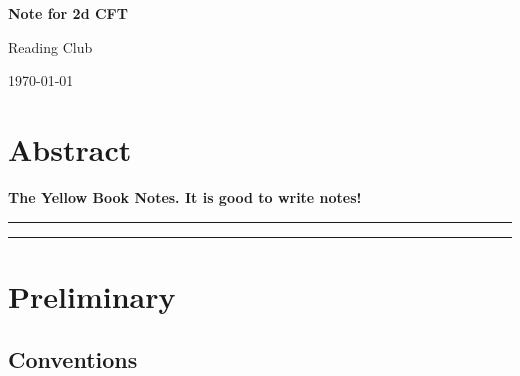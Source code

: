 \documentclass[submission, PhysLectNotes]{SciPost}
\begin{document}
\begin{center}{\Large \textbf{
Note for 2d CFT\\
}}\end{center}

\begin{center}
Reading Club%
\end{center}

\begin{center}
\end{center}

\begin{center}
\today
\end{center}


\section*{Abstract}
{\bf
The Yellow Book Notes. It is good to write notes!
}


\vspace{10pt}
\noindent\rule{\textwidth}{1pt}
\tableofcontents\thispagestyle{fancy}
\noindent\rule{\textwidth}{1pt}
\vspace{10pt}


\section{Preliminary}
\subsection{Conventions}
\end{document}
